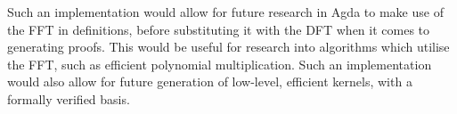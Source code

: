 Such an implementation would allow for future research in Agda to make use of
the FFT in definitions, before substituting it with the DFT when it comes to
generating proofs.
This would be useful for research into algorithms which utilise the FFT, such as
efficient polynomial multiplication.
Such an implementation would also allow for future generation of low-level, 
efficient kernels, with a formally verified basis.
